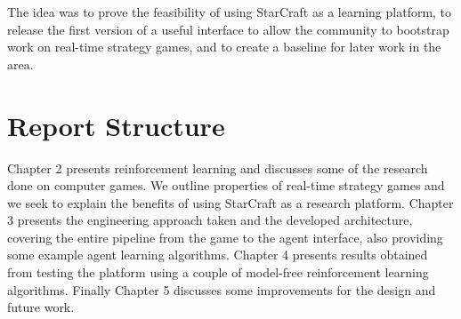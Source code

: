 The idea was to prove the feasibility of using StarCraft as a learning platform,
to release the first version of a useful interface to allow the community to
bootstrap work on real-time strategy games, and to create a baseline for later
work in the area.

\section{Report Structure}

Chapter 2 presents reinforcement learning and discusses some of the research
done on computer games. We outline properties of real-time strategy games and we
seek to explain the benefits of using StarCraft as a research platform. Chapter
3 presents the engineering approach taken and the developed architecture,
covering the entire pipeline from the game to the agent interface, also
providing some example agent learning algorithms. Chapter 4 presents results
obtained from testing the platform using a couple of model-free reinforcement
learning algorithms. Finally Chapter 5 discusses some improvements for the
design and future work.
